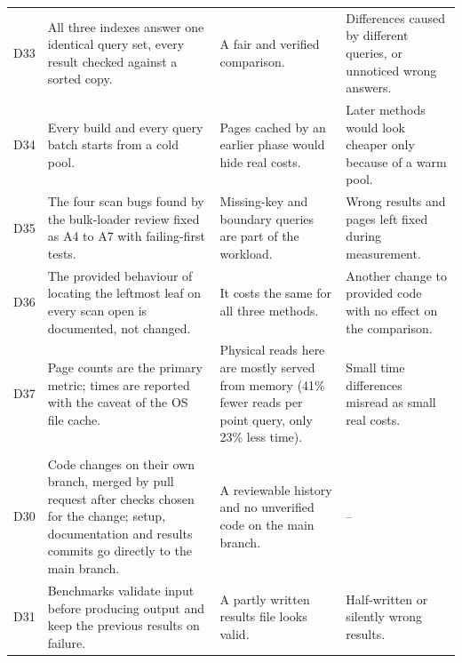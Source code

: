 \documentclass[11pt,a4paper]{article}
\begin{document}
\begin{longtable}{>{\raggedright\arraybackslash}p{0.7cm}>{\raggedright\arraybackslash}p{5.2cm}>{\raggedright\arraybackslash}p{4.4cm}>{\raggedright\arraybackslash}p{4.3cm}}
D33 & All three indexes answer one identical query set, every result checked against a sorted copy. & A fair and verified comparison. & Differences caused by different queries, or unnoticed wrong answers. \\
D34 & Every build and every query batch starts from a cold pool. & Pages cached by an earlier phase would hide real costs. & Later methods would look cheaper only because of a warm pool. \\
D35 & The four scan bugs found by the bulk-loader review fixed as A4 to A7 with failing-first tests. & Missing-key and boundary queries are part of the workload. & Wrong results and pages left fixed during measurement. \\
D36 & The provided behaviour of locating the leftmost leaf on every scan open is documented, not changed. & It costs the same for all three methods. & Another change to provided code with no effect on the comparison. \\
D37 & Page counts are the primary metric; times are reported with the caveat of the OS file cache. & Physical reads here are mostly served from memory (41\% fewer reads per point query, only 23\% less time). & Small time differences misread as small real costs. \\
\multicolumn{4}{l}{\textit{Process}} \\
D30 & Code changes on their own branch, merged by pull request after checks chosen for the change; setup, documentation and results commits go directly to the main branch. & A reviewable history and no unverified code on the main branch. & -- \\
D31 & Benchmarks validate input before producing output and keep the previous results on failure. & A partly written results file looks valid. & Half-written or silently wrong results. \\
\bottomrule
\end{longtable}
\normalsize
\end{document}
